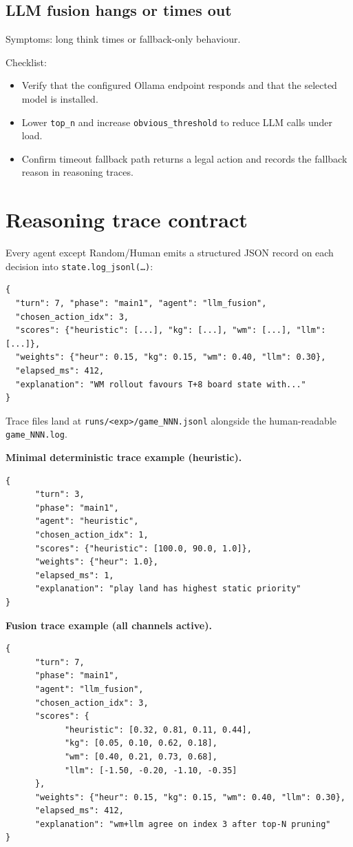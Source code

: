 \documentclass[11pt,a4paper]{article}
\begin{document}
\subsection{LLM fusion hangs or times out}
Symptoms: long think times or fallback-only behaviour.

Checklist:
\begin{itemize}[leftmargin=1.2em, itemsep=1pt]
      \item Verify that the configured Ollama endpoint responds and that the selected model is installed.
      \item Lower \texttt{top\_n} and increase \texttt{obvious\_threshold} to reduce LLM calls under load.
      \item Confirm timeout fallback path returns a legal action and records the fallback reason in reasoning traces.
\end{itemize}

\section{Reasoning trace contract}

Every agent except Random/Human emits a structured JSON record on each
decision into \texttt{state.log\_jsonl(\dots)}:

\begin{lstlisting}[language={}]
{
  "turn": 7, "phase": "main1", "agent": "llm_fusion",
  "chosen_action_idx": 3,
  "scores": {"heuristic": [...], "kg": [...], "wm": [...], "llm": [...]},
  "weights": {"heur": 0.15, "kg": 0.15, "wm": 0.40, "llm": 0.30},
  "elapsed_ms": 412,
  "explanation": "WM rollout favours T+8 board state with..."
}
\end{lstlisting}
%
Trace files land at \texttt{runs/<exp>/game\_NNN.jsonl} alongside the
human-readable \texttt{game\_NNN.log}.

\medskip\noindent\textbf{Minimal deterministic trace example (heuristic).}
\begin{lstlisting}[language={}]
{
      "turn": 3,
      "phase": "main1",
      "agent": "heuristic",
      "chosen_action_idx": 1,
      "scores": {"heuristic": [100.0, 90.0, 1.0]},
      "weights": {"heur": 1.0},
      "elapsed_ms": 1,
      "explanation": "play land has highest static priority"
}
\end{lstlisting}

\medskip\noindent\textbf{Fusion trace example (all channels active).}
\begin{lstlisting}[language={}]
{
      "turn": 7,
      "phase": "main1",
      "agent": "llm_fusion",
      "chosen_action_idx": 3,
      "scores": {
            "heuristic": [0.32, 0.81, 0.11, 0.44],
            "kg": [0.05, 0.10, 0.62, 0.18],
            "wm": [0.40, 0.21, 0.73, 0.68],
            "llm": [-1.50, -0.20, -1.10, -0.35]
      },
      "weights": {"heur": 0.15, "kg": 0.15, "wm": 0.40, "llm": 0.30},
      "elapsed_ms": 412,
      "explanation": "wm+llm agree on index 3 after top-N pruning"
}
\end{lstlisting}
\end{document}

